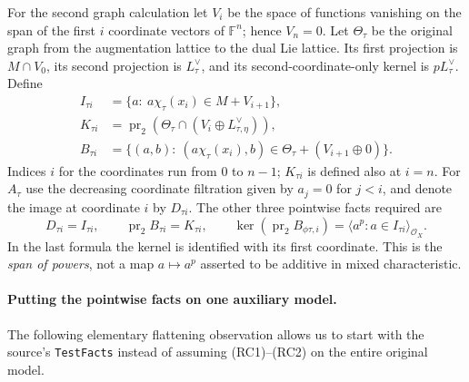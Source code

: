 For the second graph calculation let \(V_i\) be the space of functions
vanishing on the span of the first \(i\) coordinate vectors of
\(\mathbb F^n\); hence \(V_n=0\). Let \(\Theta_\tau\) be the
original graph from the augmentation lattice to the dual Lie
lattice. Its first projection is \(M\cap V_0\), its second
projection is \(L_\tau^\vee\), and its second-coordinate-only
kernel is \(p L_\tau^\vee\). Define
\[
\begin{split}
 I_{\tau i}&=\{a:\ a\chi_\tau(x_i)\in M+V_{i+1}\},\\
 K_{\tau i}&=\operatorname{pr}_2(\Theta_\tau
                         \cap(V_i\oplus L_{\tau,\eta}^\vee)),\\
 B_{\tau i}&=\{(a,b):\
       (a\chi_\tau(x_i),b)\in\Theta_\tau+(V_{i+1}\oplus0)\}.
\end{split}
\]
Indices \(i\) for the coordinates run from \(0\) to \(n-1\);
\(K_{\tau i}\) is defined also at \(i=n\).
For \(A_\tau\) use the decreasing coordinate filtration given by
\(a_j=0\) for \(j<i\), and denote the image at coordinate \(i\) by
\(D_{\tau i}\). The other three pointwise facts required are
\[
 D_{\tau i}=I_{\tau i},\qquad
 \operatorname{pr}_2 B_{\tau i}=K_{\tau i},\qquad
 \ker(\operatorname{pr}_2 B_{\phi\tau,i})
            =\langle a^p:a\in I_{\tau i}\rangle_{\mathcal O_X}.
                                                                    \tag{RC2}
\]
In the last formula the kernel is identified with its first
coordinate. This is the \emph{span of powers}, not a map
\(a\mapsto a^p\) asserted to be additive in mixed characteristic.

\paragraph{Putting the pointwise facts on one auxiliary model.}
The following elementary flattening observation allows us to start
with the source's \texttt{TestFacts} instead of assuming (RC1)--(RC2)
on the entire original model.

